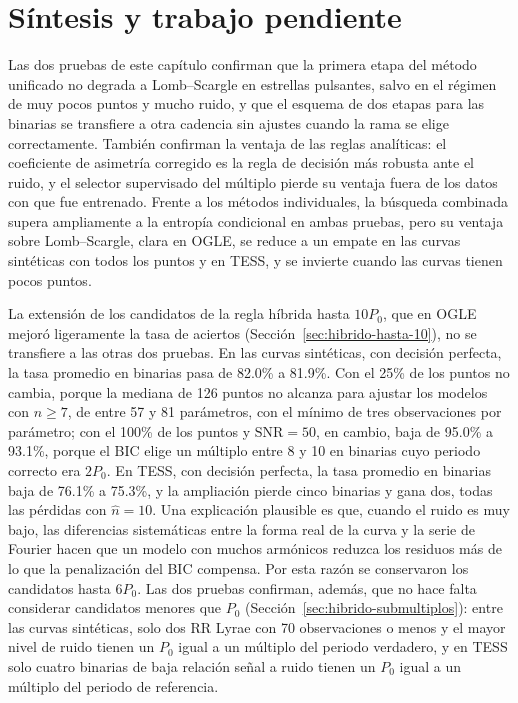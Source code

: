 \documentclass[12pt,letterpaper,oneside]{book}
\begin{document}
\section{S\'intesis y trabajo pendiente}
\label{sec:validacion-sintesis}

Las dos pruebas de este cap\'itulo confirman que la primera etapa del m\'etodo unificado no degrada a Lomb--Scargle en estrellas pulsantes, salvo en el r\'egimen de muy pocos puntos y mucho ruido, y que el esquema de dos etapas para las binarias se transfiere a otra cadencia sin ajustes cuando la rama se elige correctamente. Tambi\'en confirman la ventaja de las reglas anal\'iticas: el coeficiente de asimetr\'ia corregido es la regla de decisi\'on m\'as robusta ante el ruido, y el selector supervisado del m\'ultiplo pierde su ventaja fuera de los datos con que fue entrenado. Frente a los m\'etodos individuales, la b\'usqueda combinada supera ampliamente a la entrop\'ia condicional en ambas pruebas, pero su ventaja sobre Lomb--Scargle, clara en OGLE, se reduce a un empate en las curvas sint\'eticas con todos los puntos y en TESS, y se invierte cuando las curvas tienen pocos puntos.

La extensi\'on de los candidatos de la regla h\'ibrida hasta $10P_0$, que en OGLE mejor\'o ligeramente la tasa de aciertos (Secci\'on~\ref{sec:hibrido-hasta-10}), no se transfiere a las otras dos pruebas. En las curvas sint\'eticas, con decisi\'on perfecta, la tasa promedio en binarias pasa de 82.0\% a 81.9\%. Con el 25\% de los puntos no cambia, porque la mediana de 126 puntos no alcanza para ajustar los modelos con $n\geq7$, de entre 57 y 81 par\'ametros, con el m\'inimo de tres observaciones por par\'ametro; con el 100\% de los puntos y $\mathrm{SNR}=50$, en cambio, baja de 95.0\% a 93.1\%, porque el BIC elige un m\'ultiplo entre 8 y 10 en binarias cuyo periodo correcto era $2P_0$. En TESS, con decisi\'on perfecta, la tasa promedio en binarias baja de 76.1\% a 75.3\%, y la ampliaci\'on pierde cinco binarias y gana dos, todas las p\'erdidas con $\hat n=10$. Una explicaci\'on plausible es que, cuando el ruido es muy bajo, las diferencias sistem\'aticas entre la forma real de la curva y la serie de Fourier hacen que un modelo con muchos arm\'onicos reduzca los residuos m\'as de lo que la penalizaci\'on del BIC compensa. Por esta raz\'on se conservaron los candidatos hasta $6P_0$. Las dos pruebas confirman, adem\'as, que no hace falta considerar candidatos menores que $P_0$ (Secci\'on~\ref{sec:hibrido-submultiplos}): entre las curvas sint\'eticas, solo dos RR Lyrae con 70 observaciones o menos y el mayor nivel de ruido tienen un $P_0$ igual a un m\'ultiplo del periodo verdadero, y en TESS solo cuatro binarias de baja relaci\'on se\~nal a ruido tienen un $P_0$ igual a un m\'ultiplo del periodo de referencia.
\end{document}
